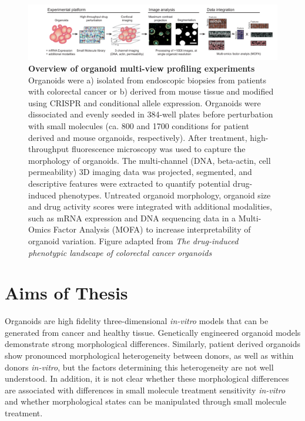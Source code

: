 \begin{flushleft}
\begin{figure}[h]
\centering
\includegraphics[width=\textwidth,
                height=\textheight,
                keepaspectratio]{figures/promise/pdf/fig_1_1_1.pdf}
\caption[Overview of organoid multi-view profiling experiments]{\textbf{Overview of organoid multi-view profiling experiments} Organoids were a) isolated from endoscopic biopsies from patients with colorectal cancer or b) derived from mouse tissue and modified using CRISPR and conditional allele expression. Organoids were dissociated and evenly seeded in 384-well plates before perturbation with small molecules (ca. 800 and 1700 conditions for patient derived and mouse organoids, respectively). After treatment, high-throughput fluorescence microscopy was used to capture the morphology of organoids.  The multi-channel (DNA, beta-actin, cell permeability) 3D imaging data was projected, segmented, and descriptive features were extracted to quantify potential drug-induced phenotypes. Untreated organoid morphology, organoid size and drug activity scores were integrated with additional modalities, such as mRNA expression and DNA sequencing data in a Multi-Omics Factor Analysis (MOFA) to increase interpretability of organoid variation. Figure adapted from \textit{The drug-induced phenotypic landscape of colorectal cancer organoids} \parencite{betgeDruginducedPhenotypicLandscape2022}}
\label{fig_130}
\end{figure}

\newpage
\section{Aims of Thesis}
Organoids are high fidelity three-dimensional \textit{in-vitro} models that can be generated from cancer and healthy tissue. Genetically engineered organoid models demonstrate strong morphological differences. Similarly, patient derived organoids show pronounced morphological heterogeneity between donors, as well as within donors \textit{in-vitro}, but the factors determining this heterogeneity are not well understood. In addition, it is not clear whether these morphological differences are associated with differences in small molecule treatment sensitivity \textit{in-vitro} and whether morphological states can be manipulated through small molecule treatment.
\bigbreak


\end{flushleft}

